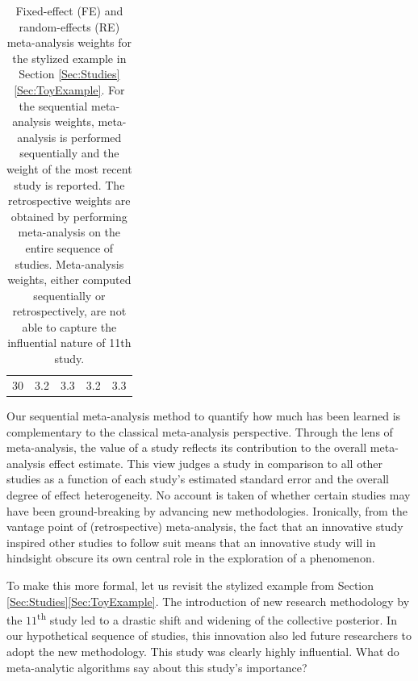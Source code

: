 \begin{table}
\begin{tabular}[t]{c|cc|cc}
30 & 3.2 & 3.3 & 3.2 & 3.3\\
\end{tabular}
\caption{\label{tab:MAweights} Fixed-effect (FE) and random-effects (RE) meta-analysis weights for the stylized example in Section \ref{Sec:Studies}\ref{Sec:ToyExample}. For the sequential meta-analysis weights, meta-analysis is performed sequentially and the weight of the most recent study is reported. The retrospective weights are obtained by performing meta-analysis on the entire sequence of studies. Meta-analysis weights, either computed sequentially or retrospectively, are not able to capture the influential nature of 11th study. }
\end{table}

Our sequential meta-analysis method to quantify how much has been learned is complementary to the classical meta-analysis perspective. Through the lens of meta-analysis, the value of a study reflects its contribution to the overall meta-analysis effect estimate. This view judges a study in comparison to all other studies as a function of each study's estimated standard error and the overall degree of effect heterogeneity. No account is taken of whether certain studies may have been ground-breaking by advancing new methodologies. Ironically, from the vantage point of (retrospective) meta-analysis, the fact that an innovative study inspired other studies to follow suit means that an innovative study will in hindsight obscure its own central role in the exploration of a phenomenon.  

To make this more formal, let us revisit the stylized example from Section \ref{Sec:Studies}\ref{Sec:ToyExample}. 
The introduction of new research methodology by the $11$\textsuperscript{th} study led to a drastic shift and widening of the collective posterior. In our hypothetical sequence of studies, this innovation also led future researchers to adopt the new methodology. This study was clearly highly influential. What do meta-analytic algorithms say about this study's importance?  

